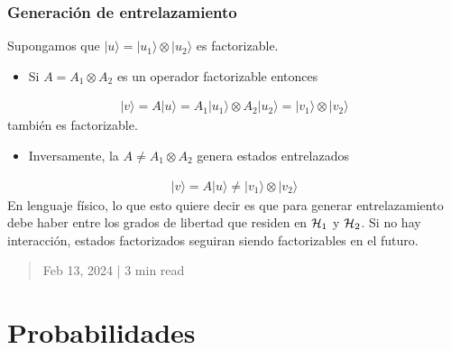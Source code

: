 \documentclass[letterpaper,10pt,english]{jupyterBook}
\newcommand{\ket}[1]{|#1\rangle}
\newcommand{\Hil}{{\cal H}}
\begin{document}
\subsubsection{Generación de entrelazamiento}
\label{\detokenize{docs/Part_01_Formalismo/Chapter_01_02_Formalismo_matem_xe1tico/01_04_Tensores_myst:generacion-de-entrelazamiento}}
\sphinxAtStartPar
Supongamos que \(\ket{u} = \ket{u_1}\otimes\ket{u_2}\) es factorizable.
\begin{itemize}
\item {} 
\sphinxAtStartPar
Si \(A=A_1\otimes A_2\) es un operador factorizable entonces

\end{itemize}
\begin{equation*}
\begin{split}\ket{v} = A\ket{u} = A_1\ket{u_1}\otimes A_2\ket{u_2} = \ket{v_1}\otimes \ket{v_2}\end{split}
\end{equation*}
\sphinxAtStartPar
también es factorizable.
\begin{itemize}
\item {} 
\sphinxAtStartPar
Inversamente, la  \(A\neq A_1\otimes A_2\) genera estados entrelazados

\end{itemize}
\begin{equation*}
\begin{split}
\ket{v} = A\ket{u}  \neq \ket{v_1}\otimes \ket{v_2}
\end{split}
\end{equation*}
\sphinxAtStartPar
En lenguaje físico, lo que esto quiere decir es que para generar entrelazamiento debe haber  entre los grados de libertad que residen en \(\Hil_1\) y \(\Hil_2\). Si no hay interacción, estados factorizados seguiran siendo factorizables en el futuro.

\sphinxstepscope
\begin{quote}

\sphinxAtStartPar
Feb 13, 2024 | 3 min read
\end{quote}


\begin{wrapfigure}{r}{0.150\linewidth}
\centering
\noindent{}
\end{wrapfigure}


\section{Probabilidades}
\label{\detokenize{docs/Part_01_Formalismo/Chapter_01_02_Formalismo_matem_xe1tico/01_05_Probabilidades_myst:probabilidades}}\label{\detokenize{docs/Part_01_Formalismo/Chapter_01_02_Formalismo_matem_xe1tico/01_05_Probabilidades_myst::doc}}
\sphinxAtStartPar
\end{document}

